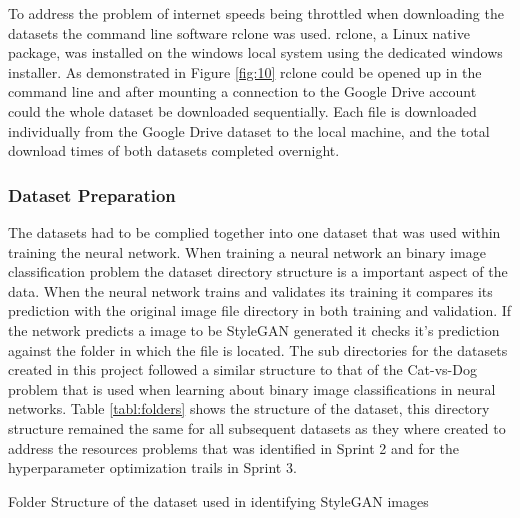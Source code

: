 To address the problem of internet speeds being throttled when downloading the datasets the command line software rclone was used. rclone, a Linux native package, was installed on the windows local system using the dedicated windows installer. As demonstrated in Figure \ref{fig:10} rclone could be opened up in the command line and after mounting a connection to the Google Drive account could the whole dataset be downloaded sequentially. Each file is downloaded individually from the Google Drive dataset to the local machine, and the total download times of both datasets completed overnight.

\subsubsection{Dataset Preparation}

The datasets had to be complied together into one dataset that was used within training the neural network. When training a neural network an binary image classification problem the dataset directory structure is a important aspect of the data. When the neural network trains and validates its training it compares its prediction with the original image file directory in both training and validation. If the network predicts a image to be StyleGAN generated it checks it's prediction against the folder in which the file is located. The sub directories for the datasets created in this project followed a similar structure to that of the Cat-vs-Dog problem that is used when learning about binary image classifications in neural networks. Table \ref{tabl:folders} shows the structure of the dataset, this directory structure remained the same for all subsequent datasets as they where created to address the resources problems that was identified in Sprint 2 and for the hyperparameter optimization trails in Sprint 3.

\begin{table}[H]%
\caption{Folder Structure of the dataset used in identifying StyleGAN images}
\label{tabl:folders}
\center
\small
{}
\end{table}

